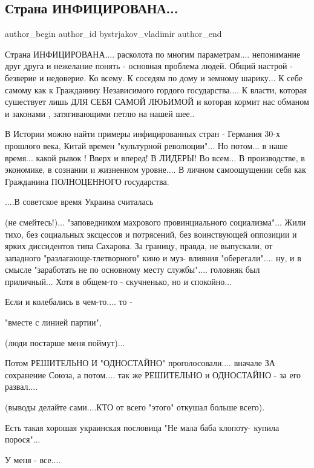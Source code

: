  
 
 
 
 
 
\subsection{Страна ИНФИЦИРОВАНА...}
\label{sec:03_12_2021.fb.bystrjakov_vladimir.1.strana_inficirovana}
 
\ifcmt
 author_begin
   author_id bystrjakov_vladimir
 author_end
\fi

Страна ИНФИЦИРОВАНА.... расколота по многим параметрам.... непонимание друг друга
и нежелание понять - основная проблема людей. Общий настрой - безверие и
недоверие. Ко всему. К соседям по дому и земному шарику... К себе самому как к
Гражданину Независимого гордого государства.... К власти, которая сушествует
лишь ДЛЯ СЕБЯ САМОЙ ЛЮЬИМОЙ и которая кормит нас обманом и  законами ,
затягивающими петлю на нашей шее..

В Истории можно найти примеры инфицированных стран - Германия 30-х прошлого
века, Китай времен "культурной революции"... Но потом... в наше время... какой
рывок ! Вверх и вперед! В ЛИДЕРЫ!  Во всем... В производстве, в экономике, в
сознании и жизненном уровне.... В личном самоощущении себя как Гражданина
ПОЛНОЦЕННОГО государства.

....В советское время Украина считалась

(не смейтесь!)... "заповедником махрового провинциального социализма"... Жили
тихо, без социальных эксцессов и потрясений, без воинствующей оппозиции и
ярких диссидентов типа Сахарова. За границу, правда, не выпускали, от западного
"разлагающе-тлетворного" кино и муз- влияния "оберегали".... ну, и в смысле
"заработать не по основному месту службы".... головняк был приличный... Хотя в
общем-то - скучненько, но и спокойно...

Если и колебались в чем-то....  то -

"вместе с линией партии", 

(люди постарше меня поймут)...

Потом РЕШИТЕЛЬНО И "ОДНОСТАЙНО" проголосовали.... вначале ЗА сохранение Союза, а
потом.... так же РЕШИТЕЛЬНО и ОДНОСТАЙНО - за его развал....

(выводы делайте сами....КТО от всего "этого" откушал больше всего).

Есть такая хорошая украинская пословица "Не мала баба клопоту- купила
порося"...

У меня - все....
